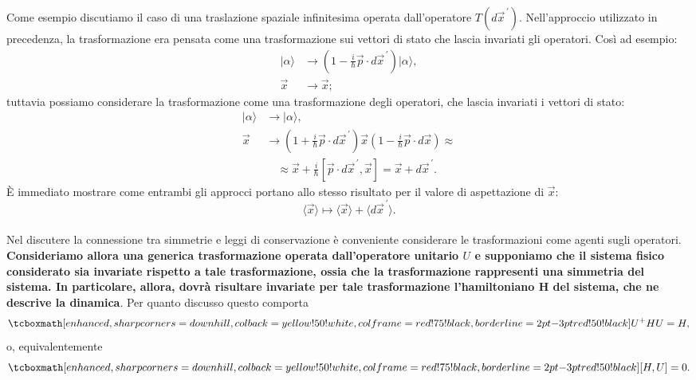 Come esempio discutiamo il caso di una traslazione spaziale infinitesima operata dall'operatore $T(d\vec{x}^{\,\prime})$.
Nell'approccio utilizzato in precedenza, la trasformazione era pensata come una trasformazione sui vettori di stato che lascia invariati gli operatori. Così ad esempio:
	\begin{align}
		  |\alpha \rangle &\rightarrow (1- \frac{i}{\hbar}\vec{p}\cdot d\vec{x}^{\, \prime}) |\alpha \rangle ,  \\
		  \vec{x}&\rightarrow \vec{x};  
	\end{align}
tuttavia possiamo considerare la trasformazione come una trasformazione degli operatori, che lascia invariati i vettori di stato:
	\begin{align}
			|\alpha \rangle &\rightarrow  |\alpha \rangle , \\
			\vec{x} &\rightarrow \left(1+ \frac{i}{\hbar} \vec{p}\cdot d\vec{x}^{\, \prime}\right) \vec{x} \left(1-\frac{i}{\hbar} \vec{p} \cdot d\vec{x}\right) \approx  \nonumber\\
			& \quad \approx\vec{x}+ \frac{i}{\hbar}[\vec{p}\cdot d\vec{x}^{\, \prime},\vec{x}]=  \vec{x}+ d\vec{x}^{\, \prime} .
	\end{align}
È immediato mostrare come entrambi gli approcci portano allo stesso risultato per il valore di aspettazione di $\vec{x}$:
	\begin{equation}
		\langle \vec{x} \rangle  \mapsto \langle \vec{x}\rangle + \langle d\vec{x}^{\, \prime} \rangle.
	\end{equation}\\

Nel discutere la connessione tra simmetrie e leggi di conservazione è conveniente considerare le trasformazioni come agenti sugli operatori. \textbf{Consideriamo allora una generica trasformazione operata dall'operatore unitario ${U}$ e supponiamo che il sistema fisico considerato sia invariate rispetto a tale trasformazione, ossia che la trasformazione rappresenti una simmetria del sistema. In particolare, allora, dovrà risultare invariate per tale trasformazione l'hamiltoniano H del sistema, che ne descrive la dinamica}. Per quanto discusso questo comporta
	\begin{equation}
		\tcboxmath[enhanced, sharp corners=downhill, colback=yellow!50!white, colframe=red!75!black, borderline={2pt}{-3pt}{red!50!black}]{
			{U}^+H{U}= H,
			}
	\end{equation}
o, equivalentemente 
	\begin{equation}
	\label{eq:cap12_5}
		\tcboxmath[enhanced, sharp corners=downhill, colback=yellow!50!white, colframe=red!75!black, borderline={2pt}{-3pt}{red!50!black}]{
			[H,{U}]=0.
			}
	\end{equation}\\

